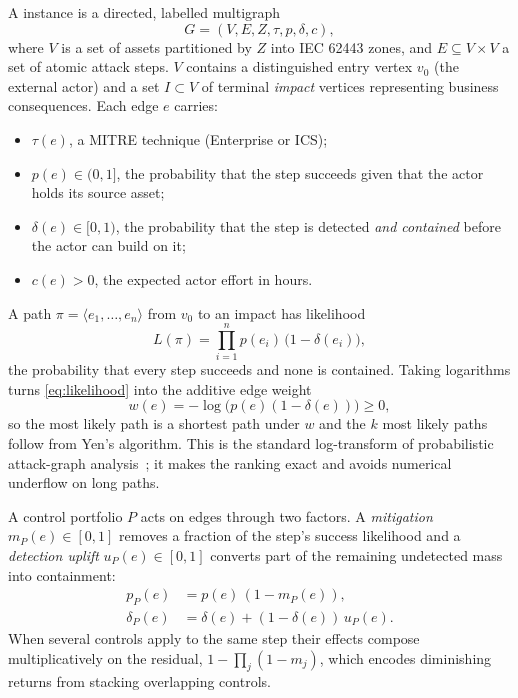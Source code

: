 A \capm{} instance is a directed, labelled multigraph
\begin{equation}
G = (V, E, Z, \tau, p, \delta, c),
\end{equation}
where $V$ is a set of assets partitioned by $Z$ into IEC 62443 zones, and
$E \subseteq V \times V$ a set of atomic attack steps. $V$ contains a
distinguished entry vertex $v_0$ (the external actor) and a set
$I \subset V$ of terminal \emph{impact} vertices representing business
consequences. Each edge $e$ carries:
\begin{itemize}
  \item $\tau(e)$, a MITRE \attck{} technique (Enterprise or ICS);
  \item $p(e) \in (0,1]$, the probability that the step succeeds given that the
    actor holds its source asset;
  \item $\delta(e) \in [0,1)$, the probability that the step is detected
    \emph{and contained} before the actor can build on it;
  \item $c(e) > 0$, the expected actor effort in hours.
\end{itemize}

A path $\pi = \langle e_1,\dots,e_n \rangle$ from $v_0$ to an impact has
likelihood
\begin{equation}
L(\pi) = \prod_{i=1}^{n} p(e_i)\,\bigl(1 - \delta(e_i)\bigr),
\label{eq:likelihood}
\end{equation}
the probability that every step succeeds and none is contained. Taking
logarithms turns \cref{eq:likelihood} into the additive edge weight
\begin{equation}
w(e) = -\log\bigl(p(e)(1-\delta(e))\bigr) \geq 0,
\end{equation}
so the most likely path is a shortest path under $w$ and the $k$ most likely
paths follow from Yen's algorithm. This is the standard log-transform of
probabilistic attack-graph analysis~\cite{wang2008attack}; it makes the ranking
exact and avoids numerical underflow on long paths.

A control portfolio $P$ acts on edges through two factors. A \emph{mitigation}
$m_P(e) \in [0,1]$ removes a fraction of the step's success likelihood and a
\emph{detection uplift} $u_P(e) \in [0,1]$ converts part of the remaining
undetected mass into containment:
\begin{align}
p_P(e) &= p(e)\,(1 - m_P(e)), \\
\delta_P(e) &= \delta(e) + (1 - \delta(e))\,u_P(e).
\end{align}
When several controls apply to the same step their effects compose
multiplicatively on the residual, $1 - \prod_j (1-m_j)$, which encodes
diminishing returns from stacking overlapping controls.

